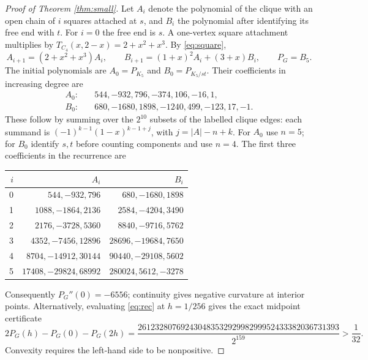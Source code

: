 \documentclass[11pt]{article}
\begin{document}
\begin{proof}[Proof of Theorem \ref{thm:small}]
Let $A_i$ denote the polynomial of the clique with an open chain of $i$ squares attached at $s$, and $B_i$ the polynomial after identifying its free end with $t$. For $i=0$ the free end is $s$. A one-vertex square attachment multiplies by $T_{C_4}(x,2-x)=2+x^2+x^3$. By \eqref{eq:square},
\begin{equation}\label{eq:rec}
A_{i+1}=(2+x^2+x^3)A_i,\qquad
B_{i+1}=(1+x)^2A_i+(3+x)B_i,\qquad P_G=B_5.
\end{equation}
The initial polynomials are $A_0=P_{K_5}$ and $B_0=P_{K_5/st}$. Their coefficients in increasing degree are
\begin{align*}
A_0:&\quad 544,-932,796,-374,106,-16,1,\\
B_0:&\quad 680,-1680,1898,-1240,499,-123,17,-1.
\end{align*}
These follow by summing over the $2^{10}$ subsets of the labelled clique edges: each summand is $(-1)^{k-1}(1-x)^{k-1+j}$, with $j=|A|-n+k$. For $A_0$ use $n=5$; for $B_0$ identify $s,t$ before counting components and use $n=4$. The first three coefficients in the recurrence are
\begin{center}
\begin{tabular}{r rr}
\toprule
$i$ & $A_i$ & $B_i$\\\midrule
0 & $544,-932,796$ & $680,-1680,1898$\\
1 & $1088,-1864,2136$ & $2584,-4204,3490$\\
2 & $2176,-3728,5360$ & $8840,-9716,5762$\\
3 & $4352,-7456,12896$ & $28696,-19684,7650$\\
4 & $8704,-14912,30144$ & $90440,-29108,5602$\\
5 & $17408,-29824,68992$ & $280024,5612,-3278$\\\bottomrule
\end{tabular}
\end{center}
Consequently $P_G''(0)=-6556$; continuity gives negative curvature at interior points. Alternatively, evaluating \eqref{eq:rec} at $h=1/256$ gives the exact midpoint certificate
\begin{equation}\label{eq:gap}
2P_G(h)-P_G(0)-P_G(2h)
=\frac{26123280769243048353292998299952433382036731393}{2^{159}}>\frac1{32}.
\end{equation}
Convexity requires the left-hand side to be nonpositive.
\end{proof}
\end{document}
